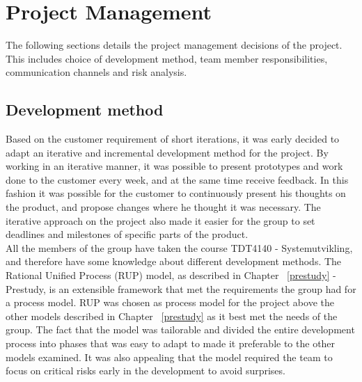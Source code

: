 \chapter{Project Management}
The following sections details the project management decisions of the project. This includes choice of development method, team member responsibilities, communication channels and risk analysis.

\section{Development method}
\label{development-method}
Based on the customer requirement of short iterations, it was early decided to adapt an iterative and incremental development method for the project. By working in an iterative manner, it was possible to present prototypes and work done to the customer every week, and at the same time receive feedback. In this fashion it was possible for the customer to continuously present his thoughts on the product, and propose changes where he thought it was necessary. The iterative approach on the project also made it easier for the group to set deadlines and milestones of specific parts of the product.\\
\newline
All the members of the group have taken the course TDT4140 - Systemutvikling, and therefore have some knowledge about different development methods. The Rational Unified Process (RUP) model, as described in Chapter ~\ref{prestudy} - Prestudy, is an extensible framework\cite{kruchten} that met the requirements the group had for a process model. RUP was chosen as process model for the project above the other models described in Chapter ~\ref{prestudy} as it best met the needs of the group. The fact that the model was tailorable and divided the entire development process into phases that was easy to adapt to made it preferable to the other models examined. It was also appealing that the model required the team to focus on critical risks early in the development to avoid surprises.

